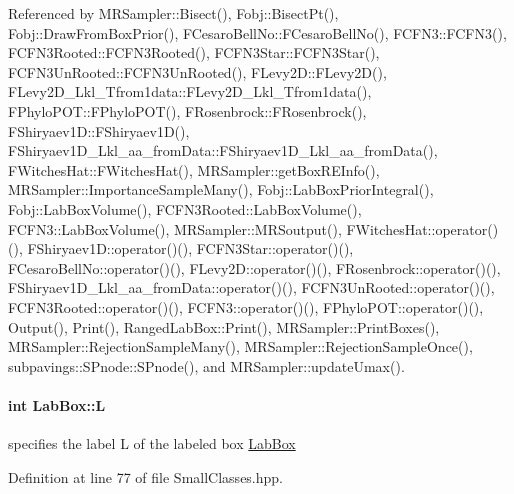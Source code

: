 \-Referenced by \-M\-R\-Sampler\-::\-Bisect(), \-Fobj\-::\-Bisect\-Pt(), \-Fobj\-::\-Draw\-From\-Box\-Prior(), \-F\-Cesaro\-Bell\-No\-::\-F\-Cesaro\-Bell\-No(), \-F\-C\-F\-N3\-::\-F\-C\-F\-N3(), \-F\-C\-F\-N3\-Rooted\-::\-F\-C\-F\-N3\-Rooted(), \-F\-C\-F\-N3\-Star\-::\-F\-C\-F\-N3\-Star(), \-F\-C\-F\-N3\-Un\-Rooted\-::\-F\-C\-F\-N3\-Un\-Rooted(), \-F\-Levy2\-D\-::\-F\-Levy2\-D(), \-F\-Levy2\-D\-\_\-\-Lkl\-\_\-\-Tfrom1data\-::\-F\-Levy2\-D\-\_\-\-Lkl\-\_\-\-Tfrom1data(), \-F\-Phylo\-P\-O\-T\-::\-F\-Phylo\-P\-O\-T(), \-F\-Rosenbrock\-::\-F\-Rosenbrock(), \-F\-Shiryaev1\-D\-::\-F\-Shiryaev1\-D(), \-F\-Shiryaev1\-D\-\_\-\-Lkl\-\_\-aa\-\_\-from\-Data\-::\-F\-Shiryaev1\-D\-\_\-\-Lkl\-\_\-aa\-\_\-from\-Data(), \-F\-Witches\-Hat\-::\-F\-Witches\-Hat(), \-M\-R\-Sampler\-::get\-Box\-R\-E\-Info(), \-M\-R\-Sampler\-::\-Importance\-Sample\-Many(), \-Fobj\-::\-Lab\-Box\-Prior\-Integral(), \-Fobj\-::\-Lab\-Box\-Volume(), \-F\-C\-F\-N3\-Rooted\-::\-Lab\-Box\-Volume(), \-F\-C\-F\-N3\-::\-Lab\-Box\-Volume(), \-M\-R\-Sampler\-::\-M\-R\-Soutput(), \-F\-Witches\-Hat\-::operator()(), \-F\-Shiryaev1\-D\-::operator()(), \-F\-C\-F\-N3\-Star\-::operator()(), \-F\-Cesaro\-Bell\-No\-::operator()(), \-F\-Levy2\-D\-::operator()(), \-F\-Rosenbrock\-::operator()(), \-F\-Shiryaev1\-D\-\_\-\-Lkl\-\_\-aa\-\_\-from\-Data\-::operator()(), \-F\-C\-F\-N3\-Un\-Rooted\-::operator()(), \-F\-C\-F\-N3\-Rooted\-::operator()(), \-F\-C\-F\-N3\-::operator()(), \-F\-Phylo\-P\-O\-T\-::operator()(), \-Output(), \-Print(), \-Ranged\-Lab\-Box\-::\-Print(), \-M\-R\-Sampler\-::\-Print\-Boxes(), \-M\-R\-Sampler\-::\-Rejection\-Sample\-Many(), \-M\-R\-Sampler\-::\-Rejection\-Sample\-Once(), subpavings\-::\-S\-Pnode\-::\-S\-Pnode(), and \-M\-R\-Sampler\-::update\-Umax().

\hypertarget{classLabBox_a4f0197d8aaeb58676d6c50f0f229a63b}{
\paragraph[{\-L}]{\setlength{\rightskip}{0pt plus 5cm}int {\bf \-Lab\-Box\-::\-L}}}\label{classLabBox_a4f0197d8aaeb58676d6c50f0f229a63b}


specifies the label \-L of the labeled box \hyperlink{classLabBox}{\-Lab\-Box} 



\-Definition at line 77 of file \-Small\-Classes.\-hpp.



